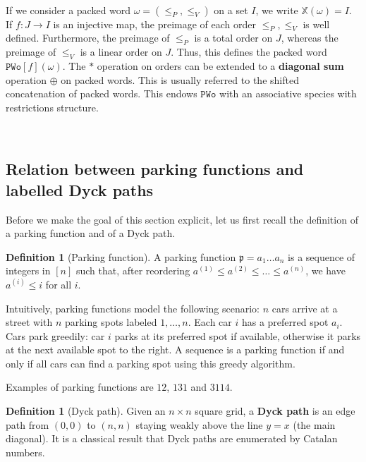 \documentclass[12pt, reqno]{amsart}
\theoremstyle{definition}
\newtheorem{defin}[thm]{Definition}
\begin{document}
\

\label{defin:pwo}
If we consider a packed word $\omega = (\leq_P, \leq_V) $ on a set $I$, we write $\mathbb{X}(\omega) = I$.
If $f:J \to I $ is an injective map, the preimage of each order $\leq_P, \leq_V$ is well defined.
Furthermore, the preimage of $\leq_P$ is a total order on $J$, whereas the preimage of $\leq_V$ is a linear order on $J$.
Thus, this defines the packed word $\mathtt{PWo}[f](\omega )$.
The $\ast $ operation on orders can be extended to a \textbf{diagonal sum} operation $\oplus $ on packed words.
This is usually referred to the shifted concatenation of packed words.
This endows $\mathtt{PWo}$ with an  associative species with restrictions structure.

\

\subsection{Relation between parking functions and labelled Dyck paths}

Before we make the goal of this section explicit, let us first recall the definition of a parking function and of a Dyck path.

\begin{defin}[Parking function]
A parking function $\mathfrak{p} = a_1 \dots a_n$ is a sequence of integers in $[n]$ such that, after reordering $a^{(1)} \leq a^{(2)} \leq \dots \leq a^{(n)}$, we have $a^{(i)} \leq i$ for all $i$.
\end{defin}

Intuitively, parking functions model the following scenario: $n$ cars arrive at a street with $n$ parking spots labeled $1, \ldots, n$. Each car $i$ has a preferred spot $a_i$. Cars park greedily: car $i$ parks at its preferred spot if available, otherwise it parks at the next available spot to the right. A sequence is a parking function if and only if all cars can find a parking spot using this greedy algorithm.

Examples of parking functions are $12$, $131$ and $3114$.

\begin{defin}[Dyck path]
Given an $n\times n$ square grid, a \textbf{Dyck path} is an edge path from $(0,0)$ to $(n,n)$ staying weakly above the line $y = x$ (the main diagonal).
It is a classical result that Dyck paths are enumerated by Catalan numbers.
\end{defin}
\end{document}
